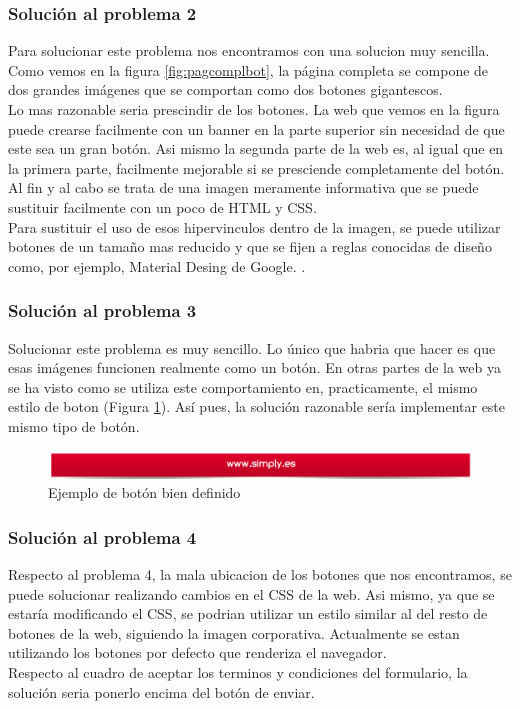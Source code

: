 \documentclass[a4paper,11pt]{article}
\begin{document}
\subsubsection{Solución al problema 2}
Para solucionar este problema nos encontramos con una solucion muy sencilla.\\
Como vemos en la figura \ref{fig:pagcomplbot}, la página completa se compone de dos grandes imágenes que se comportan como dos botones gigantescos.\\
Lo mas razonable seria prescindir de los botones. La web que vemos en la figura puede crearse facilmente con un banner en la parte superior sin necesidad de que este sea un gran botón. Asi mismo la segunda parte de la web es, al igual que en la primera parte, facilmente mejorable si se presciende completamente del botón. Al fin y al cabo se trata de una imagen meramente informativa que se puede sustituir facilmente con un poco de HTML y CSS.\\
Para sustituir el uso de esos hipervinculos dentro de la imagen, se puede utilizar botones de un tamaño mas reducido y que se fijen a reglas conocidas de diseño como, por ejemplo, Material Desing de Google. \cite{matdesing}.

\subsubsection{Solución al problema 3}
Solucionar este problema es muy sencillo. Lo único que habria que hacer es que esas imágenes funcionen realmente como un botón. En otras partes de la web ya se ha visto como se utiliza este comportamiento en, practicamente, el mismo estilo de boton (Figura \ref{fig:siesunboton}). Así pues, la solución razonable sería implementar este mismo tipo de botón.

\begin{figure}[h!]
 \centering
 \includegraphics[scale=0.4]{siesunboton.png}
 \caption{Ejemplo de botón bien definido}
 \label{fig:siesunboton}
\end{figure}

\subsubsection{Solución al problema 4}
Respecto al problema 4, la mala ubicacion de los botones que nos encontramos, se puede solucionar realizando cambios en el CSS de la web. Asi mismo, ya que se estaría modificando el CSS, se podrian utilizar un estilo similar al del resto de botones de la web, siguiendo la imagen corporativa. Actualmente se estan utilizando los botones por defecto que renderiza el navegador.\\
Respecto al cuadro de aceptar los terminos y condiciones del formulario, la solución seria ponerlo encima del botón de enviar.
\end{document}
